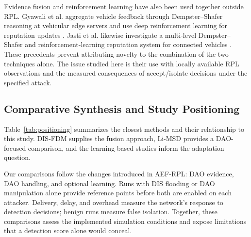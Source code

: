 \documentclass[journal]{IEEEtran}
\begin{document}
Evidence fusion and reinforcement learning have also been used together outside RPL. Gyawali et al. aggregate vehicle feedback through Dempster--Shafer reasoning at vehicular edge servers and use deep reinforcement learning for reputation updates \cite{gyawali2021}. Jasti et al. likewise investigate a multi-level Dempster--Shafer and reinforcement-learning reputation system for connected vehicles \cite{jasti2024}. These precedents prevent attributing novelty to the combination of the two techniques alone. The issue studied here is their use with locally available RPL observations and the measured consequences of accept/isolate decisions under the specified attack.

\subsection{Comparative Synthesis and Study Positioning}
Table~\ref{tab:positioning} summarizes the closest methods and their relationship to this study. DIS-FDM supplies the fusion approach, Li-MSD provides a DAO-focused comparison, and the learning-based studies inform the adaptation question.

Our comparisons follow the changes introduced in AEF-RPL: DAO evidence, DAO handling, and optional learning. Runs with DIS flooding or DAO manipulation alone provide reference points before both are enabled on each attacker. Delivery, delay, and overhead measure the network's response to detection decisions; benign runs measure false isolation. Together, these comparisons assess the implemented simulation conditions and expose limitations that a detection score alone would conceal.
\end{document}
